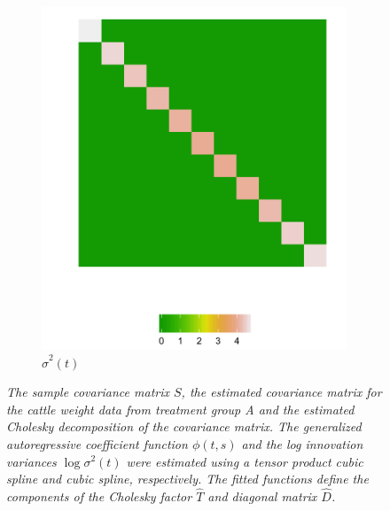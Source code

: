 \begin{figure}[H]
\begin{subfigure}[t]{.48\textwidth}
  \includegraphics[width = \textwidth]{img/chapter-5/cattle-cholesky-estimate-ggplot-log-sigma2}
 \caption{\textit{$\hat{\sigma}^2\left(t\right)$}}
\label{fig:fitted-cholesky-decomposition-cattle-date-log-sigma2}
 \end{subfigure}
 \caption{\textit{The sample covariance matrix $S$, the estimated covariance matrix for the cattle weight data from treatment group A and the estimated Cholesky decomposition of the covariance matrix. The generalized autoregressive coefficient function $\phi\left(t,s\right)$ and the log innovation variances $\log \sigma^2\left(t\right)$ were estimated using a tensor product cubic spline and cubic spline, respectively. The fitted functions define the components of the Cholesky factor $\hat{T}$ and diagonal matrix $\hat{D}$.}}  \label{fig:fitted-cholesky-decomposition-cattle-date}
\end{figure}



